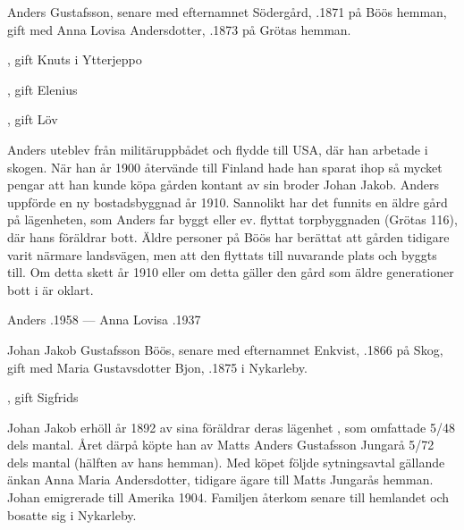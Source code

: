 %
Anders Gustafsson, senare med efternamnet Södergård, .1871 på Böös hemman, gift med Anna Lovisa Andersdotter, .1873 på Grötas hemman.
\begin{jhchildren}
  \item {}, gift Knuts i Ytterjeppo
  \item {}
  \item {}
  \item {}, gift Elenius
  \item {}, gift Löv
  \item {}
\end{jhchildren}
Anders uteblev från militäruppbådet och flydde till USA, där han arbetade i skogen. När han år 1900 återvände till Finland hade han sparat ihop så mycket pengar att han kunde köpa gården kontant av sin broder Johan Jakob. Anders uppförde en ny bostadsbyggnad år 1910. Sannolikt har det funnits en äldre gård på lägenheten, som Anders far byggt eller ev. flyttat torpbyggnaden (Grötas 116), där hans föräldrar bott. Äldre personer på Böös har berättat att gården tidigare varit närmare landsvägen, men att den flyttats till nuvarande plats och byggts till. Om detta skett år 1910 eller om detta gäller den gård som äldre generationer bott i är oklart.

Anders .1958  ---  Anna Lovisa .1937


%
Johan Jakob Gustafsson Böös, senare med efternamnet Enkvist, .1866 på Skog, gift med Maria Gustavsdotter Bjon, .1875 i Nykarleby.
\begin{jhchildren}
  \item {}
  \item {}, gift Sigfrids
\end{jhchildren}
Johan Jakob erhöll år 1892 av sina föräldrar deras lägenhet , som omfattade 5/48 dels mantal. Året därpå köpte han av Matts Anders Gustafsson Jungarå 5/72 dels mantal (hälften av hans hemman). Med köpet följde sytningsavtal gällande änkan Anna Maria Andersdotter, tidigare ägare till Matts Jungarås hemman. Johan emigrerade till Amerika 1904. Familjen återkom senare till hemlandet och bosatte sig i Nykarleby.


